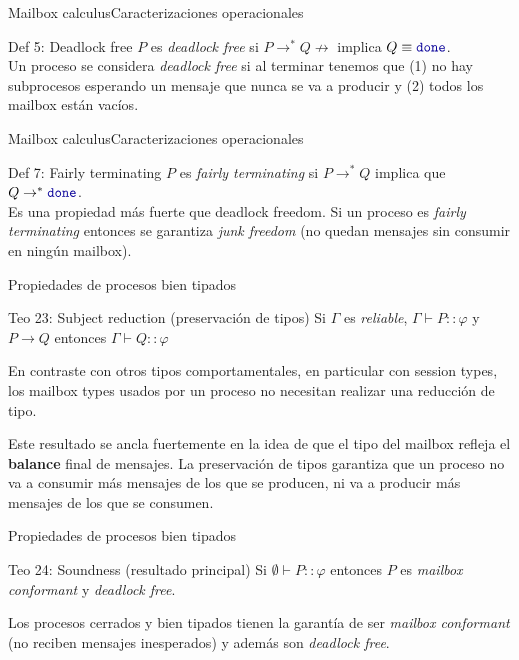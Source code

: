 \documentclass{beamer}
\newcommand{\done}{\texttt{\textcolor{keyword}{done}}}
\begin{document}
\begin{frame}{Mailbox calculus}{Caracterizaciones operacionales}
    \begin{block}{Def 5: Deadlock free}
        $P$ es \emph{deadlock free} si $P \rightarrow^\ast Q \not\rightarrow$ implica $Q \equiv \done$.
        \\
        Un proceso se considera \emph{deadlock free} si al terminar tenemos que (1) no hay subprocesos esperando un mensaje que nunca se va a producir y (2) todos los mailbox están vacíos.
    \end{block}
\end{frame}

\begin{frame}{Mailbox calculus}{Caracterizaciones operacionales}
    \begin{block}{Def 7: Fairly terminating}
        $P$ es \emph{fairly terminating} si $P \rightarrow^\ast Q$ implica que $Q \rightarrow^\ast \done$.
        \\
        Es una propiedad más fuerte que deadlock freedom. Si un proceso es \emph{fairly terminating} entonces se garantiza \emph{junk freedom} (no quedan mensajes sin consumir en ningún mailbox).
    \end{block}
\end{frame}

\begin{frame}{Propiedades de procesos bien tipados}
    \begin{block}{Teo 23: Subject reduction (preservación de tipos)}
        Si $\Gamma$ es \emph{reliable}, $\Gamma \vdash P :: \varphi$ y $P \rightarrow Q$ entonces $\Gamma \vdash Q :: \varphi$
    \end{block}
    \vspace{1em}

    En contraste con otros tipos comportamentales, en particular con session types, los mailbox types usados por un proceso no necesitan realizar una reducción de tipo.
    \vspace{1em}

    Este resultado se ancla fuertemente en la idea de que el tipo del mailbox refleja el \textbf{balance} final de mensajes. La preservación de tipos garantiza que un proceso no va a consumir más mensajes de los que se producen, ni va a producir más mensajes de los que se consumen.
\end{frame}

\begin{frame}{Propiedades de procesos bien tipados}
    \begin{block}{Teo 24: Soundness (resultado principal)}
        Si $\emptyset \vdash P :: \varphi$ entonces $P$ es \emph{mailbox conformant} y \emph{deadlock free}.
    \end{block}
    \vspace{1em}

    Los procesos cerrados y bien tipados tienen la garantía de ser \emph{mailbox conformant} (no reciben mensajes inesperados) y además son \emph{deadlock free}.
\end{frame}
\end{document}
